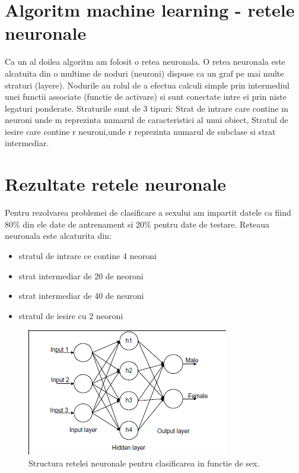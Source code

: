 \documentclass[runningheads,a4paper,11pt]{report}
\begin{document}
\section{Algoritm machine learning - retele neuronale}
\label{algoritmi}
Ca un al doilea algoritm am folosit o retea neuronala.
O retea neuronala este alcatuita din o multime de noduri (neuroni) dispuse ca un graf pe mai multe straturi (layere). Nodurile au rolul de a efectua calculi simple prin intermediul unei functii associate (functie de activare) si sunt conectate intre ei prin niste legaturi ponderate. Straturile sunt de 3 tipuri:  Strat de intrare care contine m neuroni unde m reprezinta numarul de caracteristici al unui obiect, Stratul de iesire care contine r neuroni,unde r reprezinta numarul de subclase si strat intermediar.

\section{Rezultate retele neuronale}
\label{rezultate}
Pentru rezolvarea problemei de clasificare a sexului am impartit datele ca fiind 80\% din ele date de antrenament si 20\% pentru date de testare. \newline
Reteaua neuronala este alcaturita din: 
\begin{itemize}
    \item stratul de intrare ce contine 4 neoroni
    \item strat intermediar de 20 de neoroni
    \item strat intermediar de 40 de neuroni
    \item stratul de iesire cu 2 neoroni
\end{itemize}

\begin{figure}[h!]
\centerline{\includegraphics{Imagini/retea.PNG}}
\caption{Structura retelei neuronale pentru clasificarea in functie de sex.}
\label{fig}
\end{figure}
\end{document}
